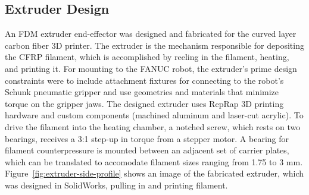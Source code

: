
\subsection*{Extruder Design}

An FDM extruder end-effector was designed and fabricated for the curved layer carbon fiber 3D printer. The extruder is the mechanism responsible for depositing the CFRP filament, which is accomplished by reeling in the filament, heating, and printing it. For mounting to the FANUC robot, the extruder's prime design constraints were to include attachment fixtures for connecting to the robot's Schunk pneumatic gripper and use geometries and materials that minimize torque on the gripper jaws. The designed extruder uses RepRap 3D printing hardware and custom components (machined aluminum and laser-cut acrylic). To drive the filament into the heating chamber, a notched screw, which rests on two bearings, receives a 3:1 step-up in torque from a stepper motor. A bearing for filament counterpressure is mounted between an adjacent set of carrier plates, which can be translated to accomodate filament sizes ranging from 1.75 to 3 mm. Figure~\ref{fig:extruder-side-profile} shows an image of the fabricated extruder, which was designed in SolidWorks, pulling in and printing filament.



